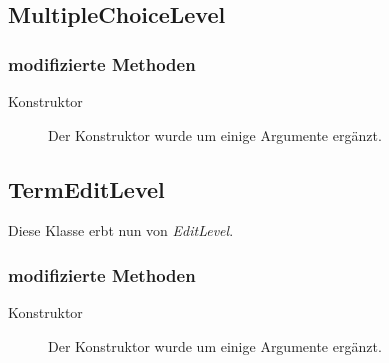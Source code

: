 \subsection{MultipleChoiceLevel}

	\subsubsection{modifizierte Methoden}
		\begin{description}
			\item[Konstruktor] Der Konstruktor wurde um einige Argumente ergänzt.
		\end{description}



\subsection{TermEditLevel}
	Diese Klasse erbt nun von \emph{EditLevel}.

	\subsubsection{modifizierte Methoden}
		\begin{description}
			\item[Konstruktor] Der Konstruktor wurde um einige Argumente ergänzt.
		\end{description}

